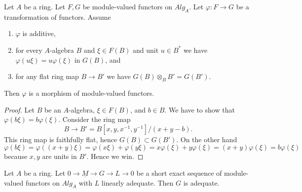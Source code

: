 \begin{lemma}
\label{lemma-flat-linear-functor}
Let $A$ be a ring.
Let $F, G$ be module-valued functors on $\textit{Alg}_A$.
Let $\varphi : F \to G$ be a transformation of functors. Assume
\begin{enumerate}
\item $\varphi$ is additive,
\item for every $A$-algebra $B$ and $\xi \in F(B)$ and unit
$u \in B^*$ we have $\varphi(u\xi) = u\varphi(\xi)$ in $G(B)$, and
\item for any flat ring map $B \to B'$ we have
$G(B) \otimes_B B' = G(B')$.
\end{enumerate}
Then $\varphi$ is a morphism of module-valued functors.
\end{lemma}

\begin{proof}
Let $B$ be an $A$-algebra, $\xi \in F(B)$, and $b \in B$. We have to show
that $\varphi(b \xi) = b \varphi(\xi)$. Consider the ring map
$$
B \to B' = B[x, y, x^{-1}, y^{-1}]/(x + y - b).
$$
This ring map is faithfully flat, hence $G(B) \subset G(B')$. On the
other hand
$$
\varphi(b\xi) = \varphi((x + y)\xi) =
\varphi(x\xi) + \varphi(y\xi) = x\varphi(\xi) + y\varphi(\xi)
= (x + y)\varphi(\xi) = b\varphi(\xi)
$$
because $x, y$ are units in $B'$. Hence we win.
\end{proof}

\begin{lemma}
\label{lemma-extension-adequate-key}
Let $A$ be a ring.
Let $0 \to \underline{M} \to G \to L \to 0$ be a short exact sequence
of module-valued functors on $\textit{Alg}_A$ with $L$ linearly adequate.
Then $G$ is adequate.
\end{lemma}

